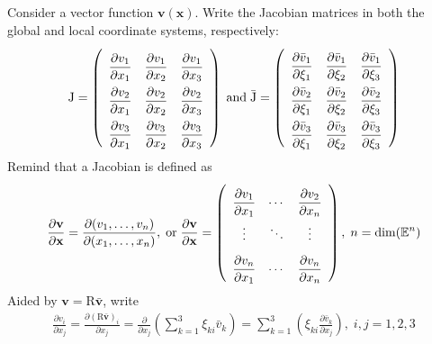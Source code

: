 \documentclass[a4paper,12pt,dvips]{article}
\begin{document}
Consider a vector function $\mathbf{v}(\mathbf{x})$.  Write the Jacobian
matrices in both the global and local coordinate systems, respectively:
\begin{align*}
  \renewcommand{\arraystretch}{2.2}
  \mathrm{J}
  = \left(\begin{array}{ccc}
    \dfrac{\partial v_1}{\partial x_1} &
    \dfrac{\partial v_1}{\partial x_2} &
    \dfrac{\partial v_1}{\partial x_3} \\
    \dfrac{\partial v_2}{\partial x_1} &
    \dfrac{\partial v_2}{\partial x_2} &
    \dfrac{\partial v_2}{\partial x_3} \\
    \dfrac{\partial v_3}{\partial x_1} &
    \dfrac{\partial v_3}{\partial x_2} &
    \dfrac{\partial v_3}{\partial x_3}
  \end{array}\right)
  \; \mbox{and} \;
  \bar{\mathrm{J}}
  = \left(\begin{array}{ccc}
    \dfrac{\partial \bar{v}_1}{\partial\xi_1} &
    \dfrac{\partial \bar{v}_1}{\partial\xi_2} &
    \dfrac{\partial \bar{v}_1}{\partial\xi_3} \\
    \dfrac{\partial \bar{v}_2}{\partial\xi_1} &
    \dfrac{\partial \bar{v}_2}{\partial\xi_2} &
    \dfrac{\partial \bar{v}_2}{\partial\xi_3} \\
    \dfrac{\partial \bar{v}_3}{\partial\xi_1} &
    \dfrac{\partial \bar{v}_3}{\partial\xi_2} &
    \dfrac{\partial \bar{v}_3}{\partial\xi_3}
  \end{array}\right)
\end{align*}
Remind that a Jacobian is defined as
\begin{align*}
  \dfrac{\partial\mathbf{v}}{\partial\mathbf{x}}
  = \dfrac{\partial(v_1, \ldots, v_n)}{\partial(x_1, \ldots, x_n)},
  \; \mbox{or} \;
  \renewcommand{\arraystretch}{2.2}
  \dfrac{\partial\mathbf{v}}{\partial\mathbf{x}}
  = \left(\begin{array}{ccc}
    \dfrac{\partial v_1}{\partial x_1} &
    \cdots &
    \dfrac{\partial v_2}{\partial x_n} \\
    \vdots & \ddots & \vdots \\
    \dfrac{\partial v_n}{\partial x_1} &
    \cdots &
    \dfrac{\partial v_n}{\partial x_n}
  \end{array}\right),
  \; n = \dim(\mathbb{E}^n)
\end{align*}
Aided by $\mathbf{v} = \mathrm{R}\bar{\mathbf{v}}$, write
\begin{align*}
  \frac{\partial v_i}{\partial x_j}
  = \frac{\partial (\mathrm{R}\bar{\mathbf{v}})_i}{\partial x_j}
  = \frac{\partial}{\partial x_j}
    \left( \sum_{k=1}^3 \xi_{ki}\bar{v}_k \right)
  = \sum_{k=1}^3
    \left( \xi_{ki} \frac{\partial \bar{v}_k}{\partial x_j} \right),
  \; i,j = 1, 2, 3
\end{align*}
\end{document}
